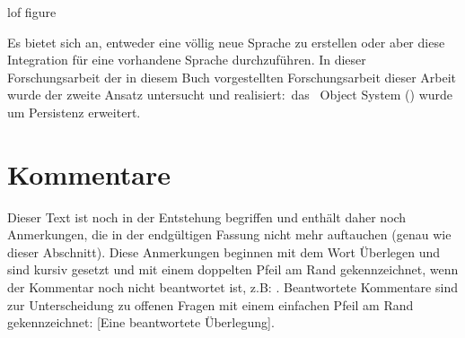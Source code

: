 %
\begin{figure}[htbp]%
\ifbuch%
\centerline{}%
\else%
\centerline{}%
\fi%
\end{figure}%
%
\addcontentsline%
 {lof}%
 {figure}%
 {\protect{}}%
%
\par\noindent{}Es bietet sich an, entweder eine v\"{o}llig neue Sprache
zu erstellen oder aber diese Integration f\"{u}r eine vorhandene
Sprache durchzuf\"{u}hren. In \ifbericht dieser Forschungsarbeit
\else\ifbuch der in diesem Buch vorgestellten Forschungsarbeit \else
dieser Arbeit \fi\fi wurde der zweite Ansatz untersucht und
realisiert:\ das \cl\ Object System (\clos) wurde um Persistenz
erweitert.
%
\iffalse
Persistente Objekte sind quasi die Vorstufe einer
Datenbank f\"{u}r Objekte. Durch Bereitstellung von Methoden, die eine
datenbank-typische Verwaltung von persistenten Objekten durchf\"{u}hren,
l\"{a}\ss{}t sich ein System, das persistente Objekte anbietet, sehr leicht
in eine objektorientierte Datenbank erweitern
\cite[\citepage{88}]{bib:at89}.
\fi
%
\ifdothink%
\section*{Kommentare}
Dieser Text ist noch in der Entstehung begriffen und enth\"{a}lt daher
noch Anmerkungen, die in der endg\"{u}ltigen Fassung nicht mehr
auftauchen (genau wie dieser Abschnitt).  Diese Anmerkungen beginnen
mit dem Wort \rglq{}\"{U}berlegen\rgrq{} und sind kursiv gesetzt und mit
einem doppelten Pfeil am Rand gekennzeichnet, wenn der Kommentar noch
nicht beantwortet ist, z.B: . Beantwortete Kommentare sind zur
Unterscheidung zu \rglq{}offenen\rgrq{} Fragen mit einem einfachen Pfeil
am Rand gekennzeichnet:
[Eine
beantwortete \"{U}berlegung].%
\fi%
%
